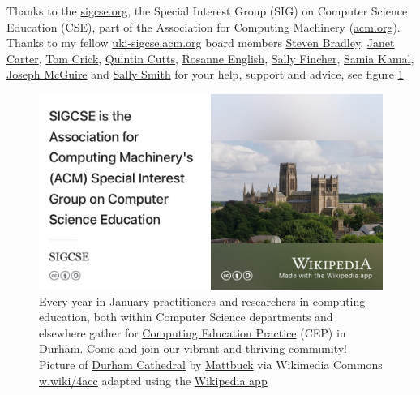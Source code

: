 \documentclass[
]{book}
\begin{document}
Thanks to the \href{https://www.sigcse.org}{sigcse.org}, the Special Interest Group (SIG) on Computer Science Education (CSE), part of the Association for Computing Machinery (\href{https://www.acm.org/}{acm.org}). Thanks to my fellow \href{https://uki-sigcse.acm.org/}{uki-sigcse.acm.org} board members \href{https://www.durham.ac.uk/staff/s-p-bradley/}{Steven Bradley}, \href{https://www.kent.ac.uk/computing/people/3101/carter-janet}{Janet Carter}, \href{https://proftomcrick.com/}{Tom Crick}, \href{https://www.gla.ac.uk/schools/computing/staff/quintincutts/}{Quintin Cutts}, \href{https://drrosanneenglish.github.io/}{Rosanne English}, \href{https://en.wikipedia.org/wiki/Sally_Fincher}{Sally Fincher}, \href{https://www.advance-he.ac.uk/ntfs/dr-samia-kamal}{Samia Kamal}, \href{https://www.gla.ac.uk/schools/computing/staff/josephmaguire/}{Joseph McGuire} and \href{https://www.napier.ac.uk/people/sally-smith}{Sally Smith} for your help, support and advice, see figure \ref{fig:sigcse-fig}

\begin{figure}

{\centering \includegraphics[width=0.99\linewidth]{images/sigcse} 

}

\caption{Every year in January practitioners and researchers in computing education, both within Computer Science departments and elsewhere gather for \href{https://cepconference.webspace.durham.ac.uk/}{Computing Education Practice} (CEP) in Durham. Come and join our \href{https://uki-sigcse.acm.org/practice/}{vibrant and thriving community}! Picture of \href{https://en.wikipedia.org/wiki/Durham_Cathedral}{Durham Cathedral} by \href{https://commons.wikimedia.org/wiki/User:Mattbuck}{Mattbuck} via Wikimedia Commons \href{https://w.wiki/4acc}{w.wiki/4acc} adapted using the \href{https://apps.apple.com/us/app/wikipedia/id324715238}{Wikipedia app}}\label{fig:sigcse-fig}
\end{figure}
\end{document}
